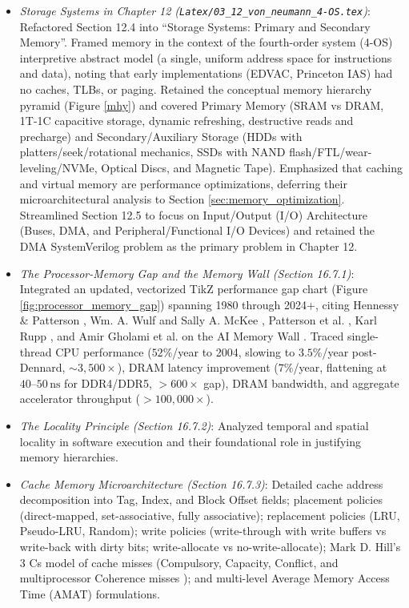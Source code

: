 \begin{itemize}
    \begin{itemize}
        \item \textit{Storage Systems in Chapter 12 (\texttt{Latex/03\_12\_von\_neumann\_4-OS.tex})}: Refactored Section 12.4 into ``Storage Systems: Primary and Secondary Memory''. Framed memory in the context of the fourth-order system (4-OS) interpretive abstract model (a single, uniform address space for instructions and data), noting that early implementations (EDVAC, Princeton IAS) had no caches, TLBs, or paging. Retained the conceptual memory hierarchy pyramid (Figure \ref{mhy}) and covered Primary Memory (SRAM vs DRAM, 1T-1C capacitive storage, dynamic refreshing, destructive reads and precharge) and Secondary/Auxiliary Storage (HDDs with platters/seek/rotational mechanics, SSDs with NAND flash/FTL/wear-leveling/NVMe, Optical Discs, and Magnetic Tape). Emphasized that caching and virtual memory are performance optimizations, deferring their microarchitectural analysis to Section \ref{sec:memory_optimization}. Streamlined Section 12.5 to focus on Input/Output (I/O) Architecture (Buses, DMA, and Peripheral/Functional I/O Devices) and retained the DMA SystemVerilog problem as the primary problem in Chapter 12.
        \item \textit{The Processor-Memory Gap and the Memory Wall (Section 16.7.1)}: Integrated an updated, vectorized TikZ performance gap chart (Figure \ref{fig:processor_memory_gap}) spanning 1980 through 2024+, citing Hennessy \& Patterson \cite{Hennessy19}, Wm. A. Wulf and Sally A. McKee \cite{wulf1995hitting}, Patterson et al. \cite{Patterson97}, Karl Rupp \cite{rupp2020microprocessor}, and Amir Gholami et al. on the AI Memory Wall \cite{gholami2021ai}. Traced single-thread CPU performance ($52\%$/year to 2004, slowing to $3.5\%$/year post-Dennard, $\sim 3{,}500\times$), DRAM latency improvement ($7\%$/year, flattening at $40\text{--}50\,\text{ns}$ for DDR4/DDR5, $>600\times$ gap), DRAM bandwidth, and aggregate accelerator throughput ($>100{,}000\times$).
        \item \textit{The Locality Principle (Section 16.7.2)}: Analyzed temporal and spatial locality in software execution and their foundational role in justifying memory hierarchies.
        \item \textit{Cache Memory Microarchitecture (Section 16.7.3)}: Detailed cache address decomposition into Tag, Index, and Block Offset fields; placement policies (direct-mapped, set-associative, fully associative); replacement policies (LRU, Pseudo-LRU, Random); write policies (write-through with write buffers vs write-back with dirty bits; write-allocate vs no-write-allocate); Mark D. Hill's 3 Cs model of cache misses (Compulsory, Capacity, Conflict, and multiprocessor Coherence misses \cite{hill1987aspects}); and multi-level Average Memory Access Time (AMAT) formulations.

\end{itemize}
\end{itemize}
